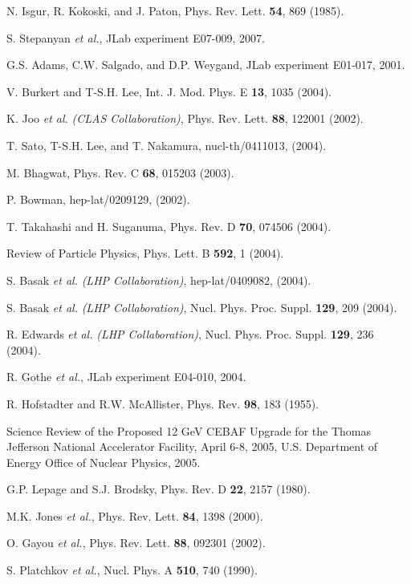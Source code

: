 \begin{thebibliography}{199}
N. Isgur, R. Kokoski, and J. Paton, Phys. Rev. Lett. {\bf 54},
869 (1985).

S. Stepanyan {\it et al.}, JLab experiment E07-009, 2007.

G.S. Adams, C.W. Salgado, and D.P. Weygand, JLab experiment E01-017, 2001.

V. Burkert and T-S.H. Lee, Int. J. Mod. Phys. E {\bf 13}, 1035 (2004).

K. Joo {\it et al.} {\it (CLAS Collaboration)}, Phys. Rev. Lett. {\bf 88},
122001 (2002).

T. Sato, T-S.H. Lee, and T. Nakamura, nucl-th/0411013, (2004).

M. Bhagwat, Phys. Rev. C {\bf 68}, 015203 (2003).

P. Bowman, hep-lat/0209129, (2002).

T. Takahashi and H. Suganuma,  Phys. Rev. D {\bf 70}, 074506 (2004).

Review of Particle Physics, Phys. Lett. B {\bf 592}, 1 (2004).

S. Basak {\it et al.} {\it (LHP Collaboration)}, hep-lat/0409082, (2004).

S. Basak {\it et al.} {\it (LHP Collaboration)}, Nucl. Phys. Proc. Suppl. 
{\bf 129}, 209 (2004).

R. Edwards {\it et al.} {\it (LHP Collaboration)}, Nucl. Phys. Proc. Suppl. 
{\bf 129}, 236 (2004).

R. Gothe {\it et al.}, JLab experiment E04-010, 2004.

%
%

R. Hofstadter and R.W. McAllister, Phys. Rev. {\bf 98}, 183 (1955).

Science Review of the Proposed 12 GeV CEBAF Upgrade for the Thomas Jefferson
National Accelerator Facility, April 6-8, 2005, U.S. Department of Energy
Office of Nuclear Physics, 2005.

G.P. Lepage and S.J. Brodsky,  Phys. Rev. D {\bf 22}, 2157 (1980).

M.K. Jones {\it et al.},  Phys. Rev. Lett. {\bf 84}, 1398 (2000).

O. Gayou {\it et al.}, Phys. Rev. Lett. {\bf 88}, 092301 (2002).

S. Platchkov {\it et al.}, Nucl. Phys. A {\bf 510}, 740 (1990).


\end{thebibliography}
